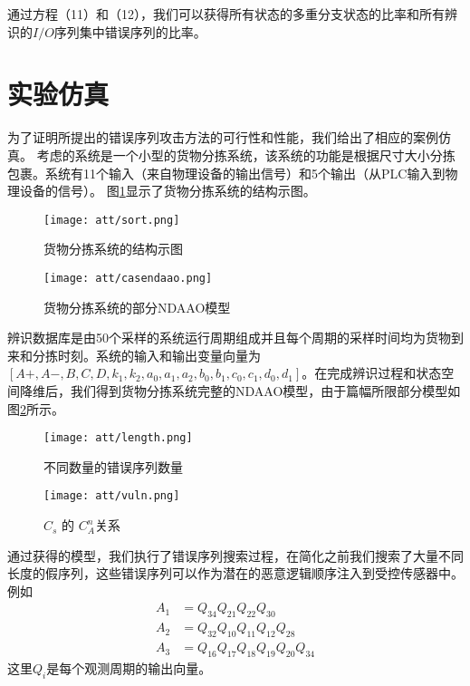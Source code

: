 通过方程（11）和（12），我们可以获得所有状态的多重分支状态的比率和所有辨识的$I/O$序列集中错误序列的比率。
\section{实验仿真}
\label{sec:simulation}

为了证明所提出的错误序列攻击方法的可行性和性能，我们给出了相应的案例仿真。 考虑的系统是一个小型的货物分拣系统，该系统的功能是根据尺寸大小分拣包裹。系统有11个输入（来自物理设备的输出信号）和5个输出（从PLC输入到物理设备的信号）。 图\ref{fig7}显示了货物分拣系统的结构示图。
\begin{figure}[!htb]
  \centering
  \texttt{[image: att/sort.png]}
  \caption{货物分拣系统的结构示图}
  \label{fig7}
\end{figure}

\begin{figure}[!htb]
  \centering
  \texttt{[image: att/casendaao.png]}
  \caption{货物分拣系统的部分NDAAO模型}
  \label{fig8}
\end{figure}


辨识数据库是由50个采样的系统运行周期组成并且每个周期的采样时间均为货物到来和分拣时刻。系统的输入和输出变量向量为$[A+,A-,B,C,D,k_1,k_2,a_0,a_1,a_2,b_0,b_1,c_0,c_1,d_0,d_1]$。在完成辨识过程和状态空间降维后，我们得到货物分拣系统完整的NDAAO模型，由于篇幅所限部分模型如图\ref{fig8}所示。
\begin{figure}[!htb]
  \centering
  \texttt{[image: att/length.png]}
  \caption{不同数量的错误序列数量}
  \label{fig9}
\end{figure}

\begin{figure}[!htb]
  \centering
  \texttt{[image: att/vuln.png]}
  \caption{$C_s$ 的 $C_A^n$关系}
  \label{fig10}
\end{figure}

通过获得的模型，我们执行了错误序列搜索过程，在简化之前我们搜索了大量不同长度的假序列，这些错误序列可以作为潜在的恶意逻辑顺序注入到受控传感器中。例如\[\begin{split} A_1&=Q_{34}Q_{21}Q_{22}Q_{30}\\A_2&=Q_{32}Q_{10}Q_{11}Q_{12}Q_{28}\\A_3&=Q_{16}Q_{17}Q_{18}Q_{19}Q_{20}Q_{34} \end{split}\]这里$Q_i$是每个观测周期的输出向量。\\

